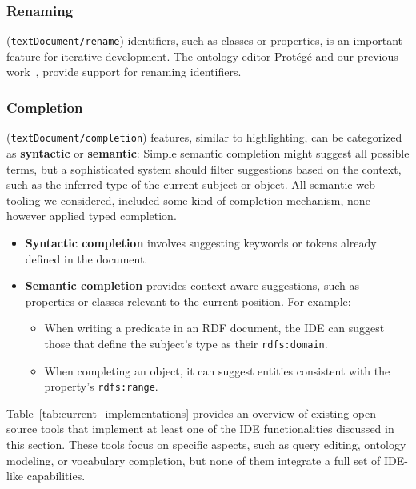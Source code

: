 \subsubsection{Renaming} (\texttt{textDocument/rename}) identifiers, such as classes or properties, is an important feature for iterative development.
The ontology editor Protégé and our previous work~\cite{JSONLD-LSP}, provide support for renaming identifiers.

\subsubsection{Completion} (\texttt{textDocument/completion}) features, similar to highlighting, can be categorized as \textbf{syntactic} or \textbf{semantic}:
Simple semantic completion might suggest all possible terms, but a sophisticated system should filter suggestions based on the context, such as the inferred type of the current subject or object.
All semantic web tooling we considered, included some kind of completion mechanism, none however applied typed completion.


\begin{itemize}
    \item \textbf{Syntactic completion} involves suggesting keywords or tokens already defined in the document.
    \item \textbf{Semantic completion} provides context-aware suggestions, such as properties or classes relevant to the current position. For example:
    \begin{itemize}
        \item When writing a predicate in an RDF document, the IDE can suggest those that define the subject's type as their \texttt{rdfs:domain}.
        \item When completing an object, it can suggest entities consistent with the property's \texttt{rdfs:range}.
    \end{itemize}
\end{itemize}

Table~\ref{tab:current_implementations} provides an overview of existing open-source tools that implement at least one of the IDE functionalities discussed in this section.
These tools focus on specific aspects, such as query editing, ontology modeling, or vocabulary completion, but none of them integrate a full set of IDE-like capabilities.


